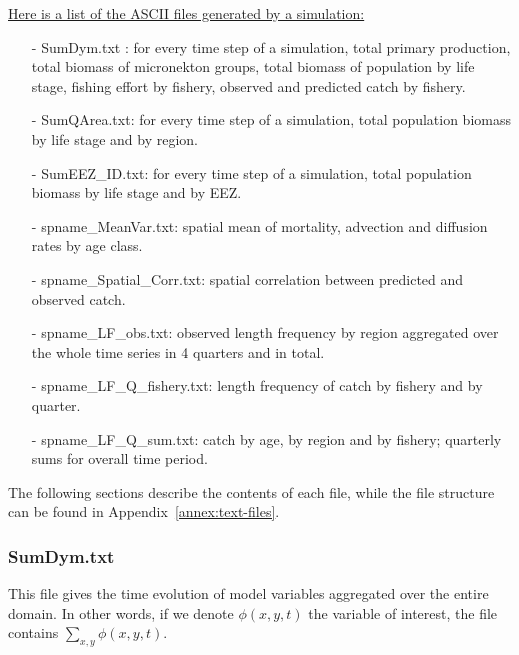 \underline{Here is a list of the ASCII files generated by a simulation:}
\begin{itemize}
    \item[-] {\ttfamily SumDym.txt} : for every time step of a simulation, total primary production, total biomass of micronekton groups, total biomass of population by life stage, fishing effort by fishery, observed and predicted catch by fishery.  
    \item[-] {\ttfamily SumQArea.txt}: for every time step of a simulation, total population biomass by life stage and by region.
    \item[-] {\ttfamily SumEEZ\_ID.txt}: for every time step of a simulation, total population biomass by life stage and by EEZ.    
      \item[-] {\ttfamily spname\_MeanVar.txt}: spatial mean of mortality, advection and diffusion rates by age class.
       \item[-] {\ttfamily spname\_Spatial\_Corr.txt}: spatial correlation between predicted and observed catch.
    \item[-] {\ttfamily spname\_LF\_obs.txt}: observed length frequency by region aggregated over the whole time series in 4 quarters and in total.
    \item[-] {\ttfamily spname\_LF\_Q\_fishery.txt}: length frequency of catch by fishery and by quarter.
    \item[-] {\ttfamily spname\_LF\_Q\_sum.txt}: catch by age, by region and by fishery; quarterly sums for overall time period.
\end{itemize}

The following sections describe the contents of each file, while the file structure can be found in Appendix~\ref{annex:text-files}.

\subsubsection{{\ttfamily SumDym.txt}}

This file gives the time evolution of model variables aggregated over the entire domain. In other words, if we denote $\phi(x,y,t)$ the variable of interest, the file contains $\sum\limits_{x,y}\phi(x,y,t)$. 

